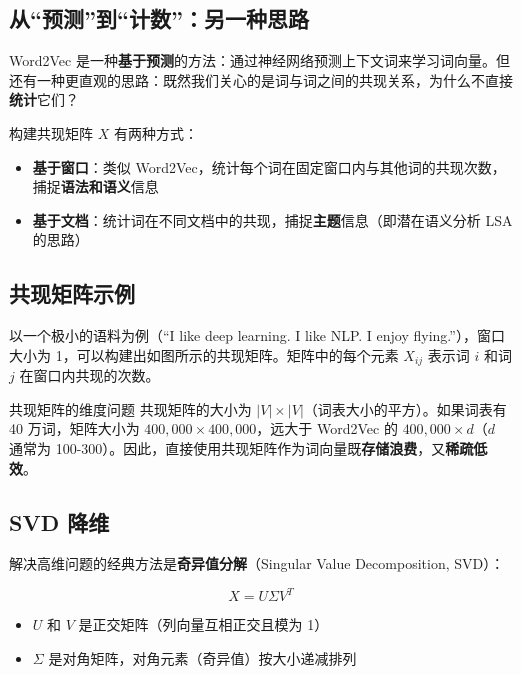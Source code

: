 \documentclass[a4paper]{article}
\begin{document}
\subsection{从``预测''到``计数''：另一种思路}

Word2Vec 是一种\textbf{基于预测}的方法：通过神经网络预测上下文词来学习词向量。但还有一种更直观的思路：既然我们关心的是词与词之间的共现关系，为什么不直接\textbf{统计}它们？





构建共现矩阵 $X$ 有两种方式：
\begin{itemize}
    \item \textbf{基于窗口}：类似 Word2Vec，统计每个词在固定窗口内与其他词的共现次数，捕捉\textbf{语法和语义}信息
    \item \textbf{基于文档}：统计词在不同文档中的共现，捕捉\textbf{主题}信息（即潜在语义分析 LSA 的思路）
\end{itemize}

\subsection{共现矩阵示例}





以一个极小的语料为例（``I like deep learning. I like NLP. I enjoy flying.''），窗口大小为 1，可以构建出如图所示的共现矩阵。矩阵中的每个元素 $X_{ij}$ 表示词 $i$ 和词 $j$ 在窗口内共现的次数。

\begin{warningbox}{共现矩阵的维度问题}
共现矩阵的大小为 $|V| \times |V|$（词表大小的平方）。如果词表有 40 万词，矩阵大小为 $400{,}000 \times 400{,}000$，远大于 Word2Vec 的 $400{,}000 \times d$（$d$ 通常为 100-300）。因此，直接使用共现矩阵作为词向量既\textbf{存储浪费}，又\textbf{稀疏低效}。
\end{warningbox}

\subsection{SVD 降维}

解决高维问题的经典方法是\textbf{奇异值分解}（Singular Value Decomposition, SVD）：

$$X = U \Sigma V^T$$

\begin{itemize}
    \item $U$ 和 $V$ 是正交矩阵（列向量互相正交且模为 1）
    \item $\Sigma$ 是对角矩阵，对角元素（奇异值）按大小递减排列
\end{itemize}
\end{document}
